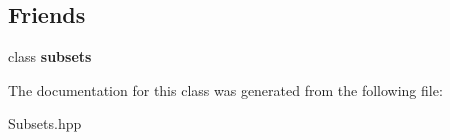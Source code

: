 \subsection*{Friends}
\begin{DoxyCompactItemize}
\item 
\hypertarget{classdis_1_1subsets_1_1iterator_abed2904a726e23118b717410aad7366d}{class {\bfseries subsets}}\label{classdis_1_1subsets_1_1iterator_abed2904a726e23118b717410aad7366d}

\end{DoxyCompactItemize}


The documentation for this class was generated from the following file\-:\begin{DoxyCompactItemize}
\item 
Subsets.\-hpp\end{DoxyCompactItemize}
